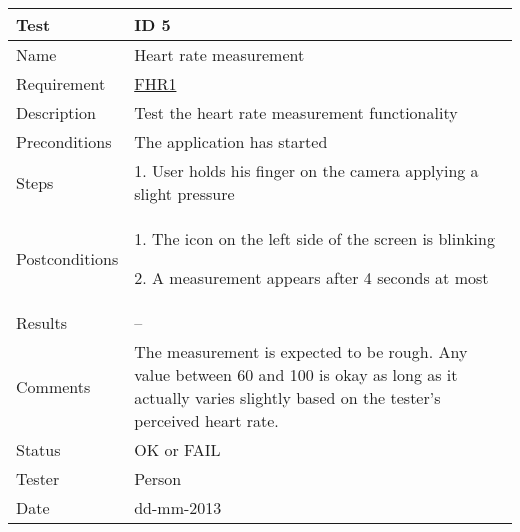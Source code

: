 \begin{table}
\begin{center}
\begin{tabular}{ | l | p{10cm} | }
	\hline
	\textbf{Test}	&	\textbf{ID 5} \\
	\hline\noalign{\smallskip}\noalign{\smallskip}\hline
	Name				& Heart rate measurement \\
	Requirement			& \hyperref[table:reqheartrate]{FHR1} \\
	Description			& Test the heart rate measurement functionality \\
	Preconditions		& The application has started \\
	Steps 				&	\par 1. User holds his finger on the camera applying a slight pressure \\
	Postconditions		&	\par 1. The icon on the left side of the screen is blinking 
							\par 2. A measurement appears after 4 seconds at most \\
	Results				& -- \\
	Comments			&	The measurement is expected to be rough.
							Any value between 60 and 100 is okay as long as it actually varies slightly based
							on the tester's perceived heart rate.  \\
	Status				& OK or FAIL \\
	Tester				& Person \\
	Date				& dd-mm-2013 \\
	\hline
\end{tabular}
\end{center}
\end{table}

